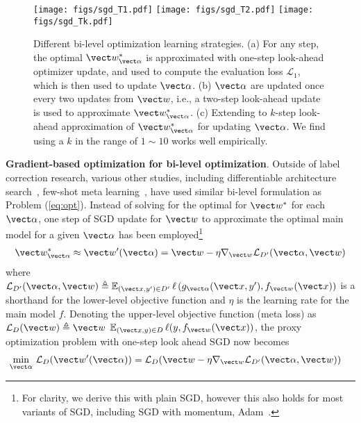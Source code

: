 \begin{figure}[t]
  \centering \texttt{[image: figs/sgd\_T1.pdf]}
  \hfill
  \texttt{[image: figs/sgd\_T2.pdf]}
  \hfill
  \texttt{[image: figs/sgd\_Tk.pdf]}
\caption{Different bi-level optimization learning strategies.  (a) For any step, the optimal $\vect
    w^*_{\vect\alpha}$ is approximated with one-step look-ahead
    optimizer update, and used to compute the
    evaluation loss $\mathcal{L}_1$, which is then used to update $\vect\alpha$.  (b) $\vect\alpha$ are updated once every two updates from $\vect w$, i.e., a two-step look-ahead update is
    used to approximate $\vect w^*_{\vect
      \alpha}$. (c) Extending to $k$-step look-ahead approximation of
    $\vect w^*_{\vect \alpha}$ for updating $\vect \alpha$.
We find
    using a $k$ in the range of $1\sim 10$ works well empirically.}
  \label{fig:sgdT}
\end{figure}


\textbf{Gradient-based optimization for bi-level
  optimization}. Outside of label correction research, various other
studies, including differentiable architecture
search~\cite{liu2018darts}, few-shot meta
learning~\cite{finn2017model,nichol2018first}, have used similar bi-level formulation
as Problem (\ref{eq:opt}). Instead of solving for the optimal for
$\vect w^*$ for each $\vect \alpha$, one step of SGD update for $\vect
w$ to approximate the optimal main model for a given $\vect \alpha$
has been employed\footnote{For clarity, we derive this with plain SGD,
  however this also holds for most variants of SGD, including SGD with
  momentum, Adam~\cite{kingma2014adam}.}\begin{align}
\vect w^*_{\vect \alpha}\approx   \vect w'(\vect \alpha)= \vect w-\eta\nabla_{\vect w}\mathcal{L}_{D'}(\vect \alpha, \vect w)\end{align}
 where $\mathcal{L}_{D'}(\vect \alpha, \vect
w)\triangleq\mathbb{E}_{(\vect x, y')\in D'}\,\ell\left(g_{\vect
  \alpha}(\vect x, y'), f_{\vect w}(\vect x)\right)$ is a shorthand for the
lower-level objective function and $\eta$ is the learning rate for the
main model $f$. Denoting the upper-level objective function (meta loss) as
$\mathcal{L}_{D}(\vect w)\triangleq\vect w$ $\mathbb{E}_{(\vect x,
  y)\in D}\,\ell(y,f_{\vect w}(\vect x))$, the proxy optimization
problem with one-step look ahead SGD now becomes
\begin{align}
  \min_{\vect\alpha}\,\mathcal{L}_{D}(\vect w'(\vect \alpha))&=\mathcal{L}_{D}(\vect w-\eta\nabla_{\vect w}\mathcal{L}_{D'}(\vect \alpha, \vect w))\end{align}


